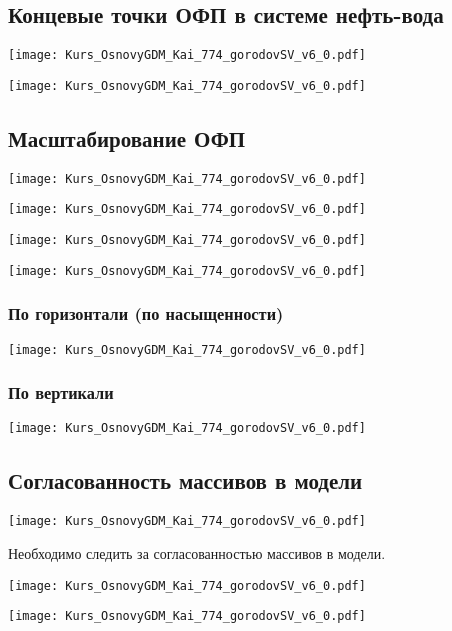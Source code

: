 \documentclass[main.tex]{subfiles}
\begin{document}
\subsection{Концевые точки ОФП в системе нефть-вода}

\texttt{[image: Kurs\_OsnovyGDM\_Kai\_774\_gorodovSV\_v6\_0.pdf]}

\texttt{[image: Kurs\_OsnovyGDM\_Kai\_774\_gorodovSV\_v6\_0.pdf]}

\subsection{Масштабирование ОФП}

\texttt{[image: Kurs\_OsnovyGDM\_Kai\_774\_gorodovSV\_v6\_0.pdf]}

\texttt{[image: Kurs\_OsnovyGDM\_Kai\_774\_gorodovSV\_v6\_0.pdf]}

\texttt{[image: Kurs\_OsnovyGDM\_Kai\_774\_gorodovSV\_v6\_0.pdf]}

\texttt{[image: Kurs\_OsnovyGDM\_Kai\_774\_gorodovSV\_v6\_0.pdf]}

\subsubsection{По горизонтали (по насыщенности)}

\texttt{[image: Kurs\_OsnovyGDM\_Kai\_774\_gorodovSV\_v6\_0.pdf]}

\subsubsection{По вертикали}

\texttt{[image: Kurs\_OsnovyGDM\_Kai\_774\_gorodovSV\_v6\_0.pdf]}

\subsection{Согласованность массивов в модели}

\texttt{[image: Kurs\_OsnovyGDM\_Kai\_774\_gorodovSV\_v6\_0.pdf]}

Необходимо следить за согласованностью массивов в модели.

\texttt{[image: Kurs\_OsnovyGDM\_Kai\_774\_gorodovSV\_v6\_0.pdf]}

\texttt{[image: Kurs\_OsnovyGDM\_Kai\_774\_gorodovSV\_v6\_0.pdf]}
\end{document}
